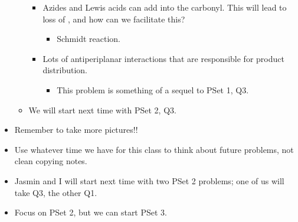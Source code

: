 \documentclass[../notes.tex]{subfiles}
\begin{document}
\begin{itemize}
\begin{itemize}
\begin{itemize}
            \item Azides and Lewis acids can add into the carbonyl. This will lead to loss of , and how can we facilitate this?
            \begin{itemize}
                \item Schmidt reaction.
            \end{itemize}
            \item Lots of antiperiplanar interactions that are responsible for product distribution.
            \begin{itemize}
                \item This problem is something of a sequel to PSet 1, Q3.
            \end{itemize}
        \end{itemize}
        \item We will start next time with PSet 2, Q3.
    \end{itemize}
    \item Remember to take more pictures!!
    \item Use whatever time we have for this class to think about future problems, not clean copying notes.
    \item Jasmin and I will start next time with two PSet 2 problems; one of us will take Q3, the other Q1.
    \item Focus on PSet 2, but we can start PSet 3.
\end{itemize}
\end{document}
